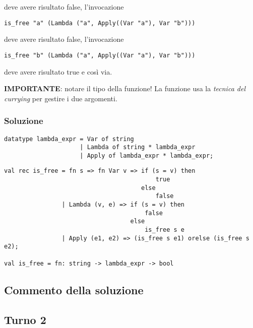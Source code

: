 deve avere risultato false, l'invocazione

\begin{lstlisting}[style = SML]
is_free "a" (Lambda ("a", Apply((Var "a"), Var "b")))
\end{lstlisting}

deve avere risultato false, l'invocazione

\begin{lstlisting}[style = SML]
is_free "b" (Lambda ("a", Apply((Var "a"), Var "b")))
\end{lstlisting}

deve avere risultato true e così via.

\medskip
\textbf{IMPORTANTE}: notare il tipo della funzione! La funzione usa la \emph{tecnica del currying} per gestire i due argomenti.

\subsubsection{Soluzione}

\begin{lstlisting}[style = SML, nolol = true, caption = {Definizione del tipo di dato \sml{espressione Lambda}}]
datatype lambda_expr = Var of string
					 | Lambda of string * lambda_expr
					 | Apply of lambda_expr * lambda_expr;
\end{lstlisting}

\begin{lstlisting}[style = SML, caption = {Definizione della funzione \sml{is\_free}}]
val rec is_free = fn s => fn Var v => if (s = v) then
									      true
									  else
									      false
				| Lambda (v, e) => if (s = v) then
									   false
								   else
									   is_free s e
				| Apply (e1, e2) => (is_free s e1) orelse (is_free s e2);

val is_free = fn: string -> lambda_expr -> bool
\end{lstlisting}

\subsection{Commento della soluzione}

\omissis


\subsection{Turno 2}

